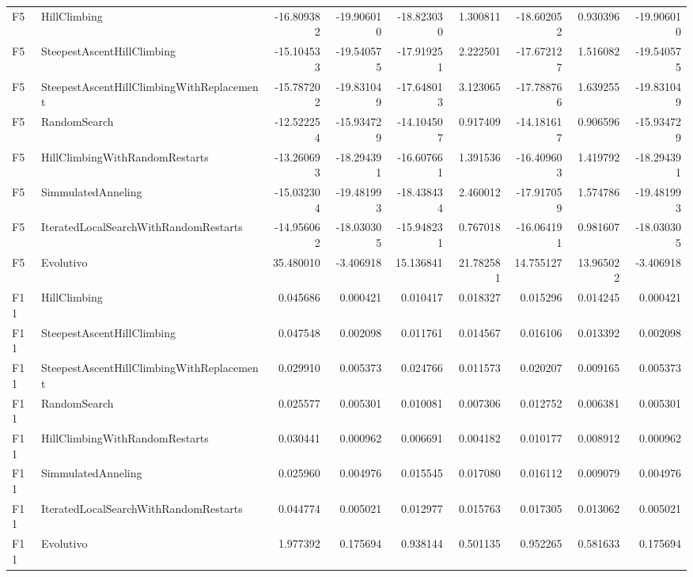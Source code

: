 \begin{tabular}{llrrrrrrr}
F5 & HillClimbing & -16.809382 & -19.906010 & -18.823030 & 1.300811 & -18.602052 & 0.930396 & -19.906010 \\
F5 & SteepestAscentHillClimbing & -15.104533 & -19.540575 & -17.919251 & 2.222501 & -17.672127 & 1.516082 & -19.540575 \\
F5 & SteepestAscentHillClimbingWithReplacement & -15.787202 & -19.831049 & -17.648013 & 3.123065 & -17.788766 & 1.639255 & -19.831049 \\
F5 & RandomSearch & -12.522254 & -15.934729 & -14.104507 & 0.917409 & -14.181617 & 0.906596 & -15.934729 \\
F5 & HillClimbingWithRandomRestarts & -13.260693 & -18.294391 & -16.607661 & 1.391536 & -16.409603 & 1.419792 & -18.294391 \\
F5 & SimmulatedAnneling & -15.032304 & -19.481993 & -18.438434 & 2.460012 & -17.917059 & 1.574786 & -19.481993 \\
F5 & IteratedLocalSearchWithRandomRestarts & -14.956062 & -18.030305 & -15.948231 & 0.767018 & -16.064191 & 0.981607 & -18.030305 \\
F5 & Evolutivo & 35.480010 & -3.406918 & 15.136841 & 21.782581 & 14.755127 & 13.965022 & -3.406918 \\
F11 & HillClimbing & 0.045686 & 0.000421 & 0.010417 & 0.018327 & 0.015296 & 0.014245 & 0.000421 \\
F11 & SteepestAscentHillClimbing & 0.047548 & 0.002098 & 0.011761 & 0.014567 & 0.016106 & 0.013392 & 0.002098 \\
F11 & SteepestAscentHillClimbingWithReplacement & 0.029910 & 0.005373 & 0.024766 & 0.011573 & 0.020207 & 0.009165 & 0.005373 \\
F11 & RandomSearch & 0.025577 & 0.005301 & 0.010081 & 0.007306 & 0.012752 & 0.006381 & 0.005301 \\
F11 & HillClimbingWithRandomRestarts & 0.030441 & 0.000962 & 0.006691 & 0.004182 & 0.010177 & 0.008912 & 0.000962 \\
F11 & SimmulatedAnneling & 0.025960 & 0.004976 & 0.015545 & 0.017080 & 0.016112 & 0.009079 & 0.004976 \\
F11 & IteratedLocalSearchWithRandomRestarts & 0.044774 & 0.005021 & 0.012977 & 0.015763 & 0.017305 & 0.013062 & 0.005021 \\
F11 & Evolutivo & 1.977392 & 0.175694 & 0.938144 & 0.501135 & 0.952265 & 0.581633 & 0.175694 \\
\bottomrule
\end{tabular}
